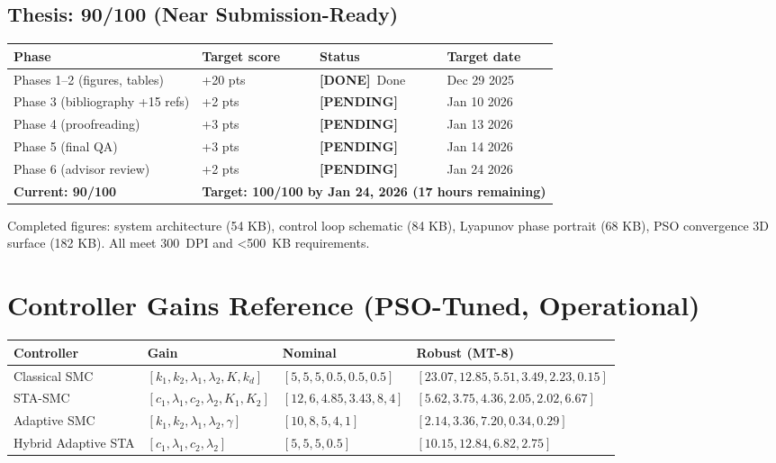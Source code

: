 \documentclass[11pt, a4paper]{article}
\newcommand{\okmark}{\textbf{\textcolor{done}{[DONE]}}}
\newcommand{\pending}{\textbf{\textcolor{pending}{[PENDING]}}}
\begin{document}
\subsection{Thesis: 90/100 (Near Submission-Ready)}

\begin{center}
\begin{tabular}{@{}p{4cm}p{2.5cm}p{2.5cm}p{3.5cm}@{}}
\toprule
\textbf{Phase} & \textbf{Target score} & \textbf{Status} & \textbf{Target date} \\
\midrule
Phases 1--2 (figures, tables) & +20 pts & \okmark\ Done & Dec 29 2025 \\
Phase 3 (bibliography +15 refs) & +2 pts & \pending\ & Jan 10 2026 \\
Phase 4 (proofreading) & +3 pts & \pending\ & Jan 13 2026 \\
Phase 5 (final QA) & +3 pts & \pending\ & Jan 14 2026 \\
Phase 6 (advisor review) & +2 pts & \pending\ & Jan 24 2026 \\
\midrule
\textbf{Current: 90/100} & \multicolumn{3}{l}{\textbf{Target: 100/100 by Jan 24, 2026 (17 hours remaining)}} \\
\bottomrule
\end{tabular}
\end{center}

Completed figures: system architecture (54 KB), control loop schematic
(84 KB), Lyapunov phase portrait (68 KB), PSO convergence 3D surface (182 KB).
All meet 300~DPI and <500~KB requirements.

\appendix
\section{Controller Gains Reference (PSO-Tuned, Operational)}

\begin{center}
\begin{tabular}{@{}p{3.5cm}lll@{}}
\toprule
\textbf{Controller}  & \textbf{Gain} & \textbf{Nominal} & \textbf{Robust (MT-8)} \\
\midrule
Classical SMC        & $[k_1,k_2,\lambda_1,\lambda_2,K,k_d]$ &
  $[5, 5, 5, 0.5, 0.5, 0.5]$ &
  $[23.07, 12.85, 5.51, 3.49, 2.23, 0.15]$ \\
STA-SMC              & $[c_1,\lambda_1,c_2,\lambda_2,K_1,K_2]$ &
  $[12, 6, 4.85, 3.43, 8, 4]$ &
  $[5.62, 3.75, 4.36, 2.05, 2.02, 6.67]$ \\
Adaptive SMC         & $[k_1,k_2,\lambda_1,\lambda_2,\gamma]$ &
  $[10, 8, 5, 4, 1]$ &
  $[2.14, 3.36, 7.20, 0.34, 0.29]$ \\
Hybrid Adaptive STA  & $[c_1,\lambda_1,c_2,\lambda_2]$ &
  $[5, 5, 5, 0.5]$ &
  $[10.15, 12.84, 6.82, 2.75]$ \\
\bottomrule
\end{tabular}
\end{center}
\end{document}
